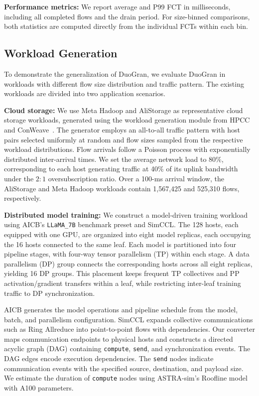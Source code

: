\documentclass[10pt,journal,compsoc]{IEEEtran}
\begin{document}
\noindent
\textbf{Performance metrics:} We report average and P99 FCT in milliseconds, including all completed flows and the drain period. For size-binned comparisons, both statistics are computed directly from the individual FCTs within each bin.



\subsection{Workload Generation} 
To demonstrate the generalization of DuoGran, we evaluate DuoGran in workloads with different flow size distribution and traffic pattern. The existing workloads are divided into two application scenarios.

\noindent
\textbf{Cloud storage:} We use Meta Hadoop and AliStorage as representative cloud storage workloads, generated using the workload generation module from HPCC~\cite{HPCC} and ConWeave~\cite{Conweave}. The generator employs an all-to-all traffic pattern with host pairs selected uniformly at random and flow sizes sampled from the respective workload distributions. Flow arrivals follow a Poisson process with exponentially distributed inter-arrival times. We set the average network load to 80\%, corresponding to each host generating traffic at 40\% of its uplink bandwidth under the $2{:}1$ oversubscription ratio. Over a 100-ms arrival window, the AliStorage and Meta Hadoop workloads contain 1,567,425 and 525,310 flows, respectively.

\noindent
\textbf{Distributed model training:} We construct a model-driven training workload using AICB's \texttt{LLaMA\_7B} benchmark preset and SimCCL. The 128 hosts, each equipped with one GPU, are organized into eight model replicas, each occupying the 16 hosts connected to the same leaf. Each model is partitioned into four pipeline stages, with four-way tensor parallelism (TP) within each stage. A data parallelism (DP) group connects the corresponding hosts across all eight replicas, yielding 16 DP groups. This placement keeps frequent TP collectives and PP activation/gradient transfers within a leaf, while restricting inter-leaf training traffic to DP synchronization.

AICB generates the model operations and pipeline schedule from the model, batch, and parallelism configuration. SimCCL expands collective communications such as Ring Allreduce into point-to-point flows with dependencies. Our converter maps communication endpoints to physical hosts and constructs a directed acyclic graph (DAG) containing \texttt{compute}, \texttt{send}, and synchronization events. The DAG edges encode execution dependencies. The \texttt{send} nodes indicate communication events with the specified source, destination, and payload size. We estimate the duration of \texttt{compute} nodes using ASTRA-sim's Roofline model with A100 parameters. 
\end{document}
